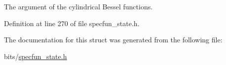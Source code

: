 The argument of the cylindrical Bessel functions. 



Definition at line 270 of file specfun\+\_\+state.\+h.



The documentation for this struct was generated from the following file\+:\begin{DoxyCompactItemize}
\item 
bits/\hyperlink{specfun__state_8h}{specfun\+\_\+state.\+h}\end{DoxyCompactItemize}
